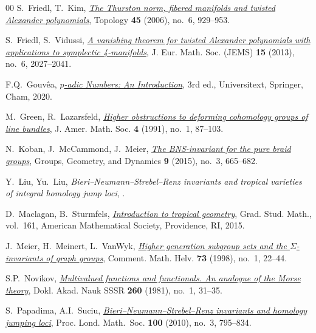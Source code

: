 \documentclass[11pt]{amsart}
\theoremstyle{definition}
\begin{document}
\begin{thebibliography}{00}
 S.~Friedl, T.~Kim, 
\href{https://doi.org/10.1016/j.top.2006.06.003}%
{\em The Thurston norm, fibered manifolds and twisted Alexander polynomials}, 
Topology \textbf{45} (2006), no.~6, 929--953.

 S.~Friedl, S.~Vidussi,
\href{https://doi.org/10.4171/JEMS/412}%
{\em A vanishing theorem for twisted Alexander polynomials 
with applications to symplectic 4-manifolds}, 
J. Eur. Math. Soc. (JEMS) \textbf{15} (2013), no.~6, 2027--2041.

 F.Q.~Gouv\^{e}a, 
\href{https://doi.org/10.1007/978-3-030-47295-5}%
{\em $p$-adic Numbers: An Introduction}, 
3rd ed., Universitext, Springer, Cham, 2020. 

 M.~Green, R.~Lazarsfeld, 
\href{https://doi.org/10.1090/S0894-0347-1991-1076513-1}%
{\em Higher obstructions to deforming cohomology groups 
of line bundles}, J. Amer. Math. Soc. \textbf{4} (1991), 
no.~1, 87--103.

 N.~Koban, J.~McCammond, J.~Meier, 
\href{https://dx.doi.org/10.4171/GGD/323}%
{\em The BNS-invariant for the pure braid groups}, 
Groups, Geometry, and Dynamics \textbf{9} (2015), 
no.~3, 665--682.

 Y.~Liu, Yu.~Liu,
{\em Bieri--Neumann--Strebel--Renz invariants and tropical 
varieties of integral homology jump loci}, .

  D.~Maclagan, B.~Sturmfels,
\href{https://doi.org/10.1090/gsm/161}%
{\em Introduction to tropical geometry}, Grad. Stud. Math., 
vol.~161, American Mathematical Society, Providence, RI, 2015. 

 J.~Meier, H.~Meinert, L.~VanWyk, 
\href{https://dx.doi.org/10.1007/s000140050044}%
{\em Higher generation subgroup sets and the 
$\Sigma$-invariants of graph groups}, Comment. 
Math. Helv. \textbf{73} (1998), no.~1, 22--44.

 S.P.~Novikov, 
\href{http://mi.mathnet.ru/eng/dan44681}%
{\em Multivalued functions and functionals. An analogue of the Morse
theory}, Dokl. Akad. Nauk SSSR \textbf{260} (1981), no.~1, 31--35.

 S.~Papadima, A.I.~Suciu,
\href{https://dx.doi.org/10.1112/plms/pdp045}%
{\em Bieri--{N}eumann--{S}trebel--{R}enz invariants and 
homology jumping loci}, Proc. Lond. Math.~Soc. 
\textbf{100} (2010), no.~3, 795--834.


\end{thebibliography}
\end{document}
